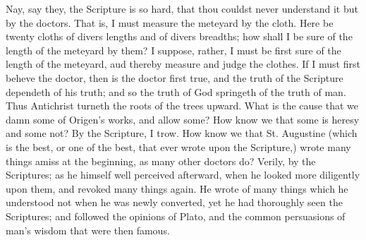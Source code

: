 Nay, say they, the Scripture is so hard, that 
thou couldst never understand it but by the doctors. 
That is, I must measure the meteyard by the 
cloth. Here be twenty cloths of divers lengths 
and of divers breadths; how shall I be sure of 
the length of the meteyard by them? I suppose,
rather, I must be first sure of the length of 
the meteyard, aud thereby measure and judge 
the clothes. If I must first beheve the doctor,
then is the doctor first true, and the truth of the 
Scripture dependeth of his truth; and so the 
truth of God springeth of the truth of man. 
Thus Antichrist turneth the roots of the trees 
upward. What is the cause that we damn 
some of Origen's works, and allow some? How 
know we that some is heresy and some not? 
By the Scripture, I trow. How know we that 
St. Augustine (which is the best, or one of the 
best, that ever wrote upon the Scripture,) wrote 
many things amiss at the beginning, as many 
other doctors do? Verily, by the Scriptures; 
as he himself well perceived afterward, when he 
looked more diligently upon them, and revoked 
many things again. He wrote of many things 
which he understood not when he was newly 
converted, yet he had thoroughly seen the Scriptures;
and followed the opinions of Plato, and 
the common persuasions of man's wisdom that 
were then famous. 

